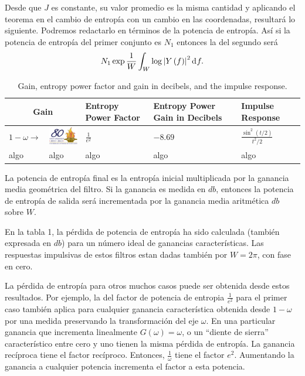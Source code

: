 Desde que $J$ es constante, su valor promedio es la misma cantidad y
aplicando el teorema en el cambio de entrop\'ia con un cambio en las
coordenadas, resultar\'a lo siguiente. Podremos redactarlo en
t\'erminos de la potencia de entrop\'ia. As\'i si la potencia de
entrop\'ia del primer conjunto es $N_{1}$ entonces la del segundo
ser\'a
\begin{equation}
N_{1}\exp \frac{1}{W}\int_{W}^{\:}\log \left | Y\left ( f \right )
\right |^{2} \diff f.
\end{equation}

\begin{table}[!ht]
\caption{Gain, entropy power factor and gain in decibels, and the impulse response.}
\label{table1}
\begin{center}
\begin{tabular}{|m{15mm}m{20mm}|m{15mm}|m{35mm}|m{40mm}|}
\hline
\multicolumn{2}{|c|}{\sc Gain} & {\sc Entropy Power Factor} & {\sc Entropy Power Gain in
Decibels} & {\sc Impulse Response} \\
\hline
$1 - \omega \longrightarrow$ & \includegraphics[width=20mm]{ejemplo.png}
& $\frac{1}{e^2}$ & $-8.69$ & $\frac{\sin^2(t/2)}{t^2 / 2}$ \\
\hline
algo & algo & algo & algo & algo \\
\hline
\end{tabular}
\end{center}
\end{table}

La potencia de entrop\'ia final es la entrop\'ia inicial multiplicada
por la ganancia media geom\'etrica del filtro. Si la ganancia es
medida en $db$, entonces la potencia de entrop\'ia de salida ser\'a
incrementada por la ganancia media aritm\'etica $db$ sobre $W$.

En la tabla 1, la p\'erdida de potencia de entrop\'ia ha sido
calculada (tambi\'en expresada en $db$) para un n\'umero ideal de
ganancias caracter\'isticas. Las respuestas impulsivas de estos
filtros estan dadas tambi\'en por $W = 2 \pi$, con fase en cero.

La p\'erdida de entrop\'ia para otros muchos casos puede ser obtenida
desde estos resultados. Por ejemplo, la del factor de potencia de
entrop\;ia $\frac{1}{e^{2}}$ para el primer caso tambi\'en aplica para
cualquier ganancia caracter\'istica obtenida desde $1-\omega$ por una
medida preservando la transformaci\'on del eje $\omega$. En una
particular ganancia que incrementa linealmente $G \left (\omega
\right) = \omega$, o un ``diente de sierra'' caracter\'istico entre cero y
uno tienen la misma p\'erdida de entrop\'ia. La ganancia rec\'iproca
tiene el factor rec\'iproco. Entonces, $\frac{1}{\omega}$ tiene el
factor $e^{2}$. Aumentando la ganancia a cualquier potencia incrementa
el factor a esta potencia.

\clearpage

